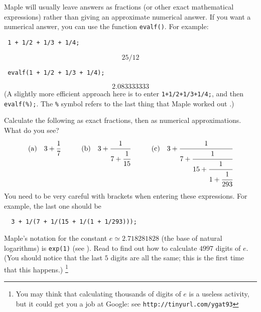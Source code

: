 \documentclass[a4paper,10pt]{amsbook}
\numberwithin{example}{chapter}
\begin{document}
Maple will usually leave answers as fractions (or other exact
mathematical expressions) rather than giving an approximate numerical
answer.  If you want a numerical answer, you can use the function
\verb~evalf()~.  For example:
\begin{verbatim}
 1 + 1/2 + 1/3 + 1/4;
\end{verbatim}
\[ 25/12 \]
\begin{verbatim}
 evalf(1 + 1/2 + 1/3 + 1/4);
\end{verbatim}
\[ 2.083333333 \]
(A slightly more efficient approach here is to enter
\verb~1+1/2+1/3+1/4;~, and then \verb~evalf(%);~.  The
\verb~%~ symbol refers to the last thing that Maple worked
out \note{\NOTEpercent}.) 

\begin{exercise}\label{ex-cfrac-pi}
 Calculate the following as exact fractions, then as numerical
 approximations.  What do you see? 
 \[ \text{(a)}\hspace{1em}
     3+\cfrac{1}{7}
    \hspace{3em}
    \text{(b)}\hspace{1em}
     3+\cfrac{1}{7 + \cfrac{1}{15}}
    \hspace{3em}
    \text{(c)}\hspace{1em}
     3+\cfrac{1}{7 + \cfrac{1}{15 + \cfrac{1}{1 + \cfrac{1}{293}}}}  
  \]
  You need to be very careful with brackets when entering these
  expressions.  For example, the last one should be
\begin{verbatim}
  3 + 1/(7 + 1/(15 + 1/(1 + 1/293)));
\end{verbatim}
\end{exercise}

\begin{exercise}\label{ex-e-digits}
 Maple's notation for the constant $e\simeq 2.718281828$ (the base of
 natural logarithms) is \verb~exp(1)~  (see
 \note{\NOTEexp}).  Read \note{\NOTEevalfdigits,\NOTEdigits} to find out
 how to calculate $4997$ digits of $e$.  (You should notice
 that the last $5$ digits are all the same; this is the first time
 that this happens.) 
 \footnote{You may think that calculating thousands of digits of $e$
 is a useless activity, but it could get you a job at Google: see
 \verb~http://tinyurl.com/ygat93~
 }
\end{exercise}
\end{document}
